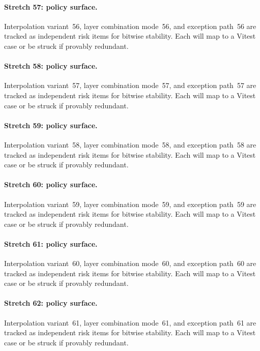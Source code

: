 \documentclass[sigconf,nonacm]{acmart}
\begin{document}
\paragraph{Stretch 57: policy surface.}
Interpolation variant~56, layer combination mode~56, and exception path~56 are tracked as independent risk items for bitwise stability. Each will map to a Vitest case or be struck if provably redundant. %

\paragraph{Stretch 58: policy surface.}
Interpolation variant~57, layer combination mode~57, and exception path~57 are tracked as independent risk items for bitwise stability. Each will map to a Vitest case or be struck if provably redundant. %

\paragraph{Stretch 59: policy surface.}
Interpolation variant~58, layer combination mode~58, and exception path~58 are tracked as independent risk items for bitwise stability. Each will map to a Vitest case or be struck if provably redundant. %

\paragraph{Stretch 60: policy surface.}
Interpolation variant~59, layer combination mode~59, and exception path~59 are tracked as independent risk items for bitwise stability. Each will map to a Vitest case or be struck if provably redundant. %

\paragraph{Stretch 61: policy surface.}
Interpolation variant~60, layer combination mode~60, and exception path~60 are tracked as independent risk items for bitwise stability. Each will map to a Vitest case or be struck if provably redundant. %

\paragraph{Stretch 62: policy surface.}
Interpolation variant~61, layer combination mode~61, and exception path~61 are tracked as independent risk items for bitwise stability. Each will map to a Vitest case or be struck if provably redundant. %
\end{document}
